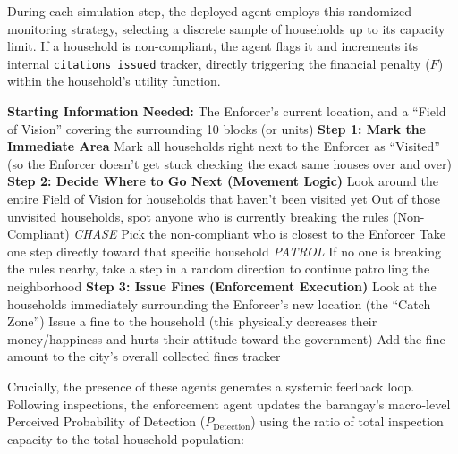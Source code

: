During each simulation step, the deployed agent employs this randomized monitoring strategy, selecting a discrete sample of households up to its capacity limit. If a household is non-compliant, the agent flags it and increments its internal \texttt{citations\_issued} tracker, directly triggering the financial penalty ($F$) within the household's utility function. 


\begin{algorithm}[H]
\caption{The Enforcer's Daily Patrol and Fining Process}
\label{alg:enforcement_patrol_english}
\begin{algorithmic}[1]
\State \textbf{Starting Information Needed:} The Enforcer's current location, and a ``Field of Vision'' covering the surrounding 10 blocks (or units)
\Statex
\State \textbf{Step 1: Mark the Immediate Area}
\State Mark all households right next to the Enforcer as ``Visited'' (so the Enforcer doesn't get stuck checking the exact same houses over and over)
\Statex
\State \textbf{Step 2: Decide Where to Go Next (Movement Logic)}
\State Look around the entire Field of Vision for households that haven't been visited yet
\State Out of those unvisited households, spot anyone who is currently breaking the rules (Non-Compliant)
\Statex
{}
    \State \textit{CHASE}
    \State Pick the non-compliant who is closest to the Enforcer
    \State Take one step directly toward that specific household
\Else
    \State \textit{PATROL}
    \State If no one is breaking the rules nearby, take a step in a random direction to continue patrolling the neighborhood
\EndIf
\Statex
\State \textbf{Step 3: Issue Fines (Enforcement Execution)}
\State Look at the households immediately surrounding the Enforcer's new location (the ``Catch Zone'')
        \State Issue a fine to the household (this physically decreases their money/happiness and hurts their attitude toward the government)
        \State Add the fine amount to the city's overall collected fines tracker
    \EndIf
\EndFor
\end{algorithmic}
\end{algorithm}


Crucially, the presence of these agents generates a systemic feedback loop. Following inspections, the enforcement agent updates the barangay's macro-level Perceived Probability of Detection ($P_{\mathrm{Detection}}$) using the ratio of total inspection capacity to the total household population:


